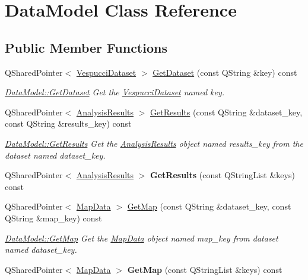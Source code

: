 \hypertarget{class_data_model}{}\section{Data\+Model Class Reference}
\label{class_data_model}
\subsection*{Public Member Functions}
\begin{DoxyCompactItemize}
\item 
Q\+Shared\+Pointer$<$ \hyperlink{class_vespucci_dataset}{Vespucci\+Dataset} $>$ \hyperlink{class_data_model_a39a26795ff351c8f25144c022761c601}{Get\+Dataset} (const Q\+String \&key) const 
\begin{DoxyCompactList}\small\item\em \hyperlink{class_data_model_a39a26795ff351c8f25144c022761c601}{Data\+Model\+::\+Get\+Dataset} Get the \hyperlink{class_vespucci_dataset}{Vespucci\+Dataset} named key. \end{DoxyCompactList}\item 
Q\+Shared\+Pointer$<$ \hyperlink{class_analysis_results}{Analysis\+Results} $>$ \hyperlink{class_data_model_af277d915c6a3aa8a2d3d38378bfdd02f}{Get\+Results} (const Q\+String \&dataset\+\_\+key, const Q\+String \&results\+\_\+key) const 
\begin{DoxyCompactList}\small\item\em \hyperlink{class_data_model_af277d915c6a3aa8a2d3d38378bfdd02f}{Data\+Model\+::\+Get\+Results} Get the \hyperlink{class_analysis_results}{Analysis\+Results} object named results\+\_\+key from the dataset named dataset\+\_\+key. \end{DoxyCompactList}\item 
Q\+Shared\+Pointer$<$ \hyperlink{class_analysis_results}{Analysis\+Results} $>$ {\bfseries Get\+Results} (const Q\+String\+List \&keys) const \hypertarget{class_data_model_a176e3a30663cedcdfeb8ff43e96c3f08}{}\label{class_data_model_a176e3a30663cedcdfeb8ff43e96c3f08}

\item 
Q\+Shared\+Pointer$<$ \hyperlink{class_map_data}{Map\+Data} $>$ \hyperlink{class_data_model_a190e371dfaa3045527af6f6d2e41cf32}{Get\+Map} (const Q\+String \&dataset\+\_\+key, const Q\+String \&map\+\_\+key) const 
\begin{DoxyCompactList}\small\item\em \hyperlink{class_data_model_a190e371dfaa3045527af6f6d2e41cf32}{Data\+Model\+::\+Get\+Map} Get the \hyperlink{class_map_data}{Map\+Data} object named map\+\_\+key from dataset named dataset\+\_\+key. \end{DoxyCompactList}\item 
Q\+Shared\+Pointer$<$ \hyperlink{class_map_data}{Map\+Data} $>$ {\bfseries Get\+Map} (const Q\+String\+List \&keys) const \hypertarget{class_data_model_aad98e14defecb0477347a5fd36d8f6a2}{}\label{class_data_model_aad98e14defecb0477347a5fd36d8f6a2}


\end{DoxyCompactItemize}
